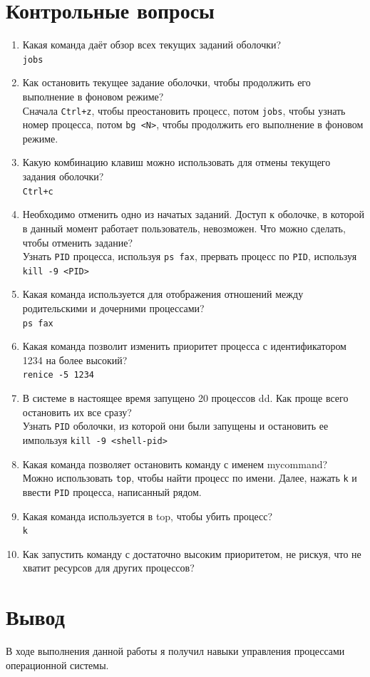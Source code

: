\documentclass[12pt]{article}
\begin{document}
\section{Контрольные вопросы}
\begin{enumerate}
	\item Какая команда даёт обзор всех текущих заданий оболочки? \\
	      \texttt{jobs}
	\item Как остановить текущее задание оболочки, чтобы продолжить его выполнение в фоновом режиме? \\
	      Сначала \texttt{Ctrl+z}, чтобы преостановить процесс, потом \texttt{jobs}, чтобы узнать номер процесса, потом \texttt{bg <N>}, чтобы продолжить его выполнение в фоновом режиме.
	\item Какую комбинацию клавиш можно использовать для отмены текущего задания оболочки? \\
	      \texttt{Ctrl+c}
	\item Необходимо отменить одно из начатых заданий. Доступ к оболочке, в которой в данный момент работает пользователь, невозможен. Что можно сделать, чтобы отменить задание? \\
	      Узнать \texttt{PID} процесса, используя \texttt{ps fax}, прервать процесс по \texttt{PID}, используя \texttt{kill -9 <PID>}
	\item Какая команда используется для отображения отношений между родительскими и дочерними процессами? \\
	      \texttt{ps fax}
	\item Какая команда позволит изменить приоритет процесса с идентификатором 1234 на более высокий? \\
	      \texttt{renice -5 1234}
	\item В системе в настоящее время запущено 20 процессов dd. Как проще всего остановить их все сразу? \\
	      Узнать \texttt{PID} оболочки, из которой они были запущены и остановить ее импользуя \texttt{kill -9 <shell-pid>}
	\item Какая команда позволяет остановить команду с именем mycommand? \\
	      Можно использовать \texttt{top}, чтобы найти процесс по имени. Далее, нажать \texttt{k} и ввести \texttt{PID} процесса, написанный рядом.
	\item Какая команда используется в top, чтобы убить процесс? \\
	      \texttt{k}
	\item Как запустить команду с достаточно высоким приоритетом, не рискуя, что не хватит ресурсов для других процессов?
\end{enumerate}

\section{Вывод}
В ходе выполнения данной работы я получил навыки управления процессами операционной системы.
\end{document}
